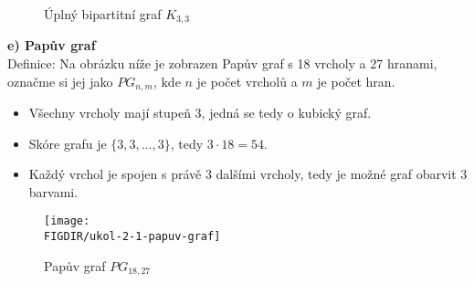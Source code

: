 \documentclass[10pt, a4paper]{ReportSheet}
\begin{document}
    \begin{figure}[H]
        \centering
        \caption{Úplný bipartitní graf $K_{3,3}$}
        \label{fig:ukol-2-1d-uplny-bipartitni-graf}
    \end{figure}

    \newpage

    \textbf{e) Papův graf}\\
    Definice: Na obrázku níže je zobrazen Papův graf s 18 vrcholy a 27 hranami, označme si jej jako $PG_{n, m}$, kde $
    n$ je počet vrcholů a $m$ je počet hran.

    \begin{itemize}
        \item Všechny vrcholy mají stupeň 3, jedná se tedy o kubický graf.
        \item Skóre grafu je $\{3, 3, \dots, 3\}$, tedy $3 \cdot 18 = 54$.
        \item Každý vrchol je spojen s právě 3 dalšími vrcholy, tedy je možné graf obarvit 3 barvami.
    \end{itemize}

    \begin{figure}[H]
        \centering
        \texttt{[image: \\FIGDIR/ukol-2-1-papuv-graf]}
        \caption{Papův graf $PG_{18, 27}$}
        \label{fig:ukol-2-1-papuv-graf}\label{fig:figure}
    \end{figure}
\end{document}
